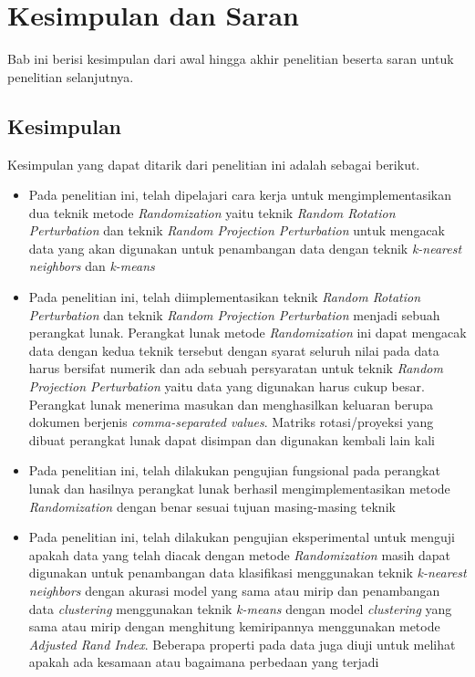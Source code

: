 \chapter{Kesimpulan dan Saran}
\label{chap:kesimpulan-saran}

Bab ini berisi kesimpulan dari awal hingga akhir penelitian beserta saran untuk penelitian selanjutnya.

\section{Kesimpulan}
\label{sec:kesimpulan}

Kesimpulan yang dapat ditarik dari penelitian ini adalah sebagai berikut.
\begin{itemize}
    \item Pada penelitian ini, telah dipelajari cara kerja untuk mengimplementasikan dua teknik metode \textit{Randomization} yaitu teknik \textit{Random Rotation Perturbation} dan teknik \textit{Random Projection Perturbation} untuk mengacak data yang akan digunakan untuk penambangan data dengan teknik \textit{k-nearest neighbors} dan \textit{k-means}
    \item Pada penelitian ini, telah diimplementasikan teknik \textit{Random Rotation Perturbation} dan teknik \textit{Random Projection Perturbation} menjadi sebuah perangkat lunak. Perangkat lunak metode \textit{Randomization} ini dapat mengacak data dengan kedua teknik tersebut dengan syarat seluruh nilai pada data harus bersifat numerik dan ada sebuah persyaratan untuk teknik \textit{Random Projection Perturbation} yaitu data yang digunakan harus cukup besar. Perangkat lunak menerima masukan dan menghasilkan keluaran berupa dokumen berjenis \textit{comma-separated values}. Matriks rotasi/proyeksi yang dibuat perangkat lunak dapat disimpan dan digunakan kembali lain kali
    \item Pada penelitian ini, telah dilakukan pengujian fungsional pada perangkat lunak dan hasilnya perangkat lunak berhasil mengimplementasikan metode \textit{Randomization} dengan benar sesuai tujuan masing-masing teknik
    \item Pada penelitian ini, telah dilakukan pengujian eksperimental untuk menguji apakah data yang telah diacak dengan metode \textit{Randomization} masih dapat digunakan untuk penambangan data klasifikasi menggunakan teknik \textit{k-nearest neighbors} dengan akurasi model yang sama atau mirip dan penambangan data \textit{clustering} menggunakan teknik \textit{k-means} dengan model \textit{clustering} yang sama atau mirip dengan menghitung kemiripannya menggunakan metode \textit{Adjusted Rand Index}. Beberapa properti pada data juga diuji untuk melihat apakah ada kesamaan atau bagaimana perbedaan yang terjadi

\end{itemize}
